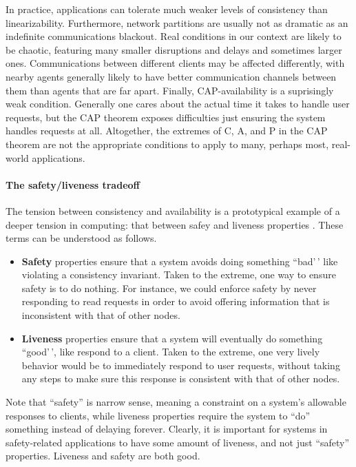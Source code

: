 \documentclass[]             %
{NASA}                       %
\theoremstyle{definition}
\begin{document}
In practice, applications can tolerate much weaker levels of consistency
than linearizability. Furthermore, network partitions are usually not as
dramatic as an indefinite communications blackout. Real conditions in
our context are likely to be chaotic, featuring many smaller disruptions
and delays and sometimes larger ones. Communications between different
clients may be affected differently, with nearby agents generally likely
to have better communication channels between them than agents that are
far apart. Finally, CAP-availability is a suprisingly weak condition.
Generally one cares about the actual time it takes to handle user
requests, but the CAP theorem exposes difficulties just ensuring the
system handles requests at all. Altogether, the extremes of C, A, and P
in the CAP theorem are not the appropriate conditions to apply to many,
perhaps most, real-world applications.

\paragraph{The safety/liveness tradeoff}

The tension between consistency and availability is a prototypical
example of a deeper tension in computing: that between safey and
liveness properties \cite{10.1145/5505.5508,2012perspectivesCAP}. These terms can be understood as follows.

\begin{itemize}
\item
  \textbf{Safety} properties ensure that a system avoids doing something
  ``bad'\,' like violating a consistency invariant. Taken to the
  extreme, one way to ensure safety is to do nothing. For instance, we
  could enforce safety by never responding to read requests in order to
  avoid offering information that is inconsistent with that of other
  nodes.
\item
  \textbf{Liveness} properties ensure that a system will eventually do
  something ``good'\,', like respond to a client. Taken to the extreme,
  one very lively behavior would be to immediately respond to user
  requests, without taking any steps to make sure this response is
  consistent with that of other nodes.
\end{itemize}

Note that ``safety'' is narrow sense, meaning a constraint on a system's
allowable responses to clients, while liveness properties require the
system to ``do'' something instead of delaying forever. Clearly, it is
important for systems in safety-related applications to have some amount
of liveness, and not just ``safety'' properties. Liveness and safety are
both good.
\end{document}
